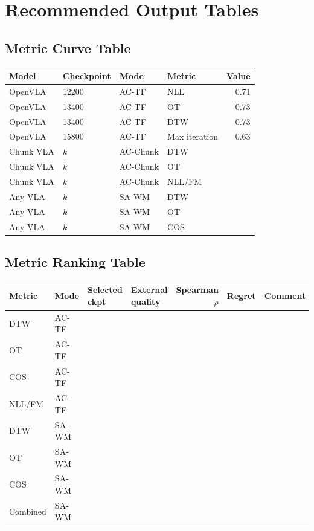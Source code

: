 \documentclass[11pt]{article}
\begin{document}
\section{Recommended Output Tables}

\subsection*{Metric Curve Table}

\begin{center}
\begin{tabular}{llllr}
\toprule
Model & Checkpoint & Mode & Metric & Value \\
\midrule
OpenVLA& 12200& AC-TF & NLL& 0.71\\
OpenVLA& 13400& AC-TF & OT & 0.73\\
 OpenVLA& 13400& AC-TF & DTW&0.73\\
OpenVLA& 15800& AC-TF & Max iteration& 0.63\\
Chunk VLA & $k$ & AC-Chunk & DTW & \\
Chunk VLA & $k$ & AC-Chunk & OT & \\
Chunk VLA & $k$ & AC-Chunk & NLL/FM & \\
Any VLA & $k$ & SA-WM & DTW & \\
Any VLA & $k$ & SA-WM & OT & \\
Any VLA & $k$ & SA-WM & COS & \\
\bottomrule
\end{tabular}
\end{center}

\subsection*{Metric Ranking Table}

\begin{center}
\begin{tabular}{llllrrr}
\toprule
Metric & Mode & Selected ckpt & External quality & Spearman $\rho$ & Regret & Comment \\
\midrule
DTW & AC-TF & & & & & \\
OT & AC-TF & & & & & \\
COS & AC-TF & & & & & \\
NLL/FM & AC-TF & & & & & \\
DTW & SA-WM & & & & & \\
OT & SA-WM & & & & & \\
COS & SA-WM & & & & & \\
Combined & SA-WM & & & & & \\
\bottomrule
\end{tabular}
\end{center}
\end{document}
